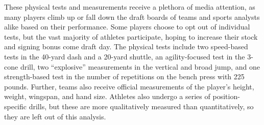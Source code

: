 \documentclass[12pt,english]{article}
\begin{document}
These physical tests and measurements receive a plethora of media attention, as many players climb up or fall down the draft boards of teams and sports analysts alike based on their performance. Some players choose to opt out of individual tests, but the vast majority of athletes participate, hoping to increase their stock and signing bonus come draft day. The physical tests include two speed-based tests in the 40-yard dash and a 20-yard shuttle, an agility-focused test in the 3-cone drill, two “explosive” measurements in the vertical and broad jump, and one strength-based test in the number of repetitions on the bench press with 225 pounds. Further, teams also receive official measurements of the player's height, weight, wingspan, and hand size. Athletes also undergo a series of position-specific drills, but these are more qualitatively measured than quantitatively, so they are left out of this analysis. 
\end{document}
